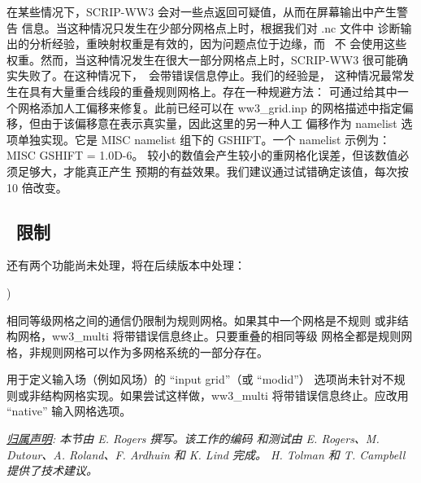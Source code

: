 在某些情况下，SCRIP-WW3 会对一些点返回可疑值，从而在屏幕输出中产生警告
信息。当这种情况只发生在少部分网格点上时，根据我们对 {\file .nc} 文件中
诊断输出的分析经验，重映射权重是有效的，因为问题点位于边缘，而 \ws\ 不
会使用这些权重。然而，当这种情况发生在很大一部分网格点上时，SCRIP-WW3
很可能确实失败了。在这种情况下，\ws\ 会带错误信息停止。我们的经验是，
这种情况最常发生在具有大量重合线段的重叠规则网格上。存在一种规避方法：
可通过给其中一个网格添加人工偏移来修复。此前已经可以在 {\file ww3\_grid.inp}
的网格描述中指定偏移，但由于该偏移意在表示真实量，因此这里的另一种人工
偏移作为 namelist 选项单独实现。它是 {\F MISC} namelist 组下的
{\code GSHIFT}。一个 namelist 示例为：{\code MISC GSHIFT = 1.0D-6}。
较小的数值会产生较小的重网格化误差，但该数值必须足够大，才能真正产生
预期的有益效果。我们建议通过试错确定该值，每次按 10 倍改变。

\vssub
\subsection{~限制} \label{sec:scripE}
\vssub

还有两个功能尚未处理，将在后续版本中处理：
\begin{list}{)\hfill}
            { \leftmargin 15mm 
             \rightmargin 5mm \itemsep 0mm \parsep 0mm}
\item 相同等级网格之间的通信仍限制为规则网格。如果其中一个网格是不规则
  或非结构网格，{\file ww3\_multi} 将带错误信息终止。只要重叠的相同等级
  网格全都是规则网格，非规则网格可以作为多网格系统的一部分存在。

\item 用于定义输入场（例如风场）的 ``input grid''（或 ``{\F modid}''）
  选项尚未针对不规则或非结构网格实现。如果尝试这样做，{\file ww3\_multi}
  将带错误信息终止。应改用 ``native'' 输入网格选项。

\end{list}

\noindent
\textrm{\textit{\underline{归属声明}: 本节由 E. Rogers 撰写。该工作的编码
    和测试由 E. Rogers、M. Dutour、A. Roland、F. Ardhuin 和 K. Lind 完成。
    H. Tolman 和 T. Campbell 提供了技术建议。}}

